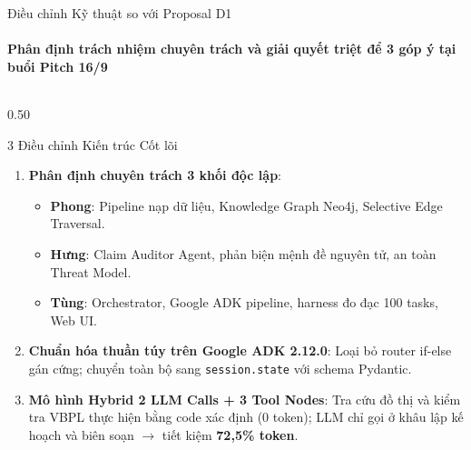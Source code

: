 \documentclass[aspectratio=169,10pt,xcolor={table}]{beamer}
\begin{document}
\begin{frame}{Điều chỉnh Kỹ thuật so với Proposal D1}
\framesubtitle{Phân định trách nhiệm chuyên trách và giải quyết triệt để 3 góp ý tại buổi Pitch 16/9}
\begin{columns}[T]
\begin{column}{0.50\textwidth}
\begin{block}{\small 3 Điều chỉnh Kiến trúc Cốt lõi}
\footnotesize
\begin{enumerate}
  \item \textbf{Phân định chuyên trách 3 khối độc lập}:
    \begin{itemize}\scriptsize
      \item \textbf{Phong}: Pipeline nạp dữ liệu, Knowledge Graph Neo4j, Selective Edge Traversal.
      \item \textbf{Hưng}: Claim Auditor Agent, phản biện mệnh đề nguyên tử, an toàn Threat Model.
      \item \textbf{Tùng}: Orchestrator, Google ADK pipeline, harness đo đạc 100 tasks, Web UI.
    \end{itemize}
  \item \textbf{Chuẩn hóa thuần túy trên Google ADK 2.12.0}:
    Loại bỏ router if-else gán cứng; chuyển toàn bộ sang \texttt{session.state} với schema Pydantic.
  \item \textbf{Mô hình Hybrid 2 LLM Calls + 3 Tool Nodes}:
    Tra cứu đồ thị và kiểm tra VBPL thực hiện bằng code xác định (0 token); LLM chỉ gọi ở khâu lập kế hoạch và biên soạn $\to$ tiết kiệm \textbf{72,5\% token}.
\end{enumerate}
\end{block}
\end{column}


\end{columns}
\end{frame}
\end{document}
